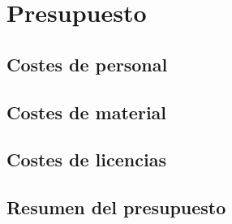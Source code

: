 \chapter{Presupuesto}
\label{cap:presupuesto}


\section{Costes de personal}

\section{Costes de material}

\section{Costes de licencias}

\section{Resumen del presupuesto}
